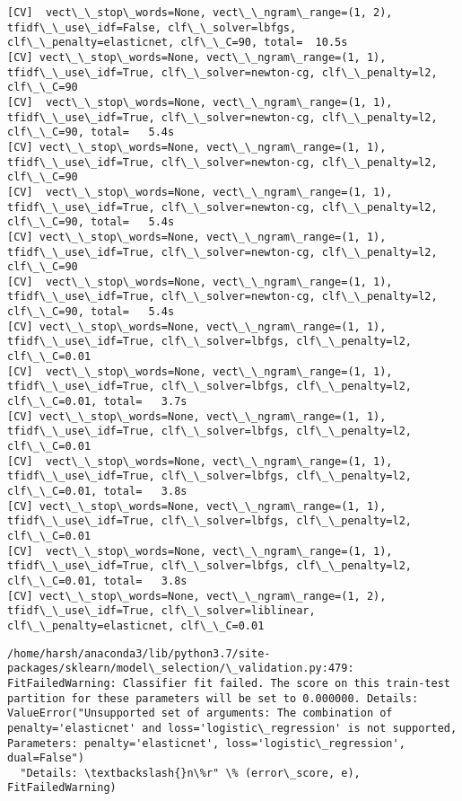 \documentclass[11pt]{article}
\begin{document}
    \begin{Verbatim}[commandchars=\\\{\}]
[CV]  vect\_\_stop\_words=None, vect\_\_ngram\_range=(1, 2), tfidf\_\_use\_idf=False, clf\_\_solver=lbfgs, clf\_\_penalty=elasticnet, clf\_\_C=90, total=  10.5s
[CV] vect\_\_stop\_words=None, vect\_\_ngram\_range=(1, 1), tfidf\_\_use\_idf=True, clf\_\_solver=newton-cg, clf\_\_penalty=l2, clf\_\_C=90 
[CV]  vect\_\_stop\_words=None, vect\_\_ngram\_range=(1, 1), tfidf\_\_use\_idf=True, clf\_\_solver=newton-cg, clf\_\_penalty=l2, clf\_\_C=90, total=   5.4s
[CV] vect\_\_stop\_words=None, vect\_\_ngram\_range=(1, 1), tfidf\_\_use\_idf=True, clf\_\_solver=newton-cg, clf\_\_penalty=l2, clf\_\_C=90 
[CV]  vect\_\_stop\_words=None, vect\_\_ngram\_range=(1, 1), tfidf\_\_use\_idf=True, clf\_\_solver=newton-cg, clf\_\_penalty=l2, clf\_\_C=90, total=   5.4s
[CV] vect\_\_stop\_words=None, vect\_\_ngram\_range=(1, 1), tfidf\_\_use\_idf=True, clf\_\_solver=newton-cg, clf\_\_penalty=l2, clf\_\_C=90 
[CV]  vect\_\_stop\_words=None, vect\_\_ngram\_range=(1, 1), tfidf\_\_use\_idf=True, clf\_\_solver=newton-cg, clf\_\_penalty=l2, clf\_\_C=90, total=   5.4s
[CV] vect\_\_stop\_words=None, vect\_\_ngram\_range=(1, 1), tfidf\_\_use\_idf=True, clf\_\_solver=lbfgs, clf\_\_penalty=l2, clf\_\_C=0.01 
[CV]  vect\_\_stop\_words=None, vect\_\_ngram\_range=(1, 1), tfidf\_\_use\_idf=True, clf\_\_solver=lbfgs, clf\_\_penalty=l2, clf\_\_C=0.01, total=   3.7s
[CV] vect\_\_stop\_words=None, vect\_\_ngram\_range=(1, 1), tfidf\_\_use\_idf=True, clf\_\_solver=lbfgs, clf\_\_penalty=l2, clf\_\_C=0.01 
[CV]  vect\_\_stop\_words=None, vect\_\_ngram\_range=(1, 1), tfidf\_\_use\_idf=True, clf\_\_solver=lbfgs, clf\_\_penalty=l2, clf\_\_C=0.01, total=   3.8s
[CV] vect\_\_stop\_words=None, vect\_\_ngram\_range=(1, 1), tfidf\_\_use\_idf=True, clf\_\_solver=lbfgs, clf\_\_penalty=l2, clf\_\_C=0.01 
[CV]  vect\_\_stop\_words=None, vect\_\_ngram\_range=(1, 1), tfidf\_\_use\_idf=True, clf\_\_solver=lbfgs, clf\_\_penalty=l2, clf\_\_C=0.01, total=   3.8s
[CV] vect\_\_stop\_words=None, vect\_\_ngram\_range=(1, 2), tfidf\_\_use\_idf=True, clf\_\_solver=liblinear, clf\_\_penalty=elasticnet, clf\_\_C=0.01 

    \end{Verbatim}

    \begin{Verbatim}[commandchars=\\\{\}]
/home/harsh/anaconda3/lib/python3.7/site-packages/sklearn/model\_selection/\_validation.py:479: FitFailedWarning: Classifier fit failed. The score on this train-test partition for these parameters will be set to 0.000000. Details: 
ValueError("Unsupported set of arguments: The combination of penalty='elasticnet' and loss='logistic\_regression' is not supported, Parameters: penalty='elasticnet', loss='logistic\_regression', dual=False")
  "Details: \textbackslash{}n\%r" \% (error\_score, e), FitFailedWarning)

    \end{Verbatim}
\end{document}
